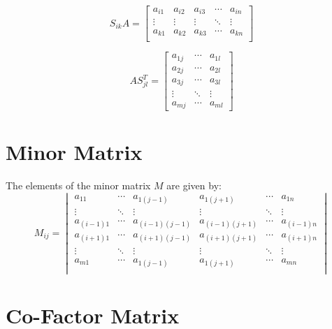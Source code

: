 \documentclass{article}
\begin{document}
    \begin{equation}
        S_{ik} A = \begin{bmatrix}
            a_{i1} & a_{i2} & a_{i3} & \cdots & a_{in} \\
            \vdots & \vdots & \vdots & \ddots & \vdots \\
            a_{k1} & a_{k2} & a_{k3} & \cdots & a_{kn} \\
        \end{bmatrix}
    \end{equation}

    \begin{equation}
        A S_{jl}^T = \begin{bmatrix}
            a_{1j} & \cdots & a_{1l} \\
            a_{2j} & \cdots & a_{2l} \\
            a_{3j} & \cdots & a_{3l} \\
            \vdots & \ddots & \vdots \\
            a_{mj} & \cdots & a_{ml}
        \end{bmatrix}
    \end{equation}

    \section{Minor Matrix}

    The elements of the minor matrix $M$ are given by: \begin{equation}
        M_{ij} = \begin{vmatrix}
            a_{11} & \cdots & a_{1(j - 1)} & a_{1(j + 1)} & \cdots & a_{1n} \\
            \vdots & \ddots & \vdots & \vdots & \ddots & \vdots \\
            a_{(i - 1)1} & \cdots & a_{(i - 1)(j - 1)} & a_{(i - 1)(j + 1)} & \cdots & a_{(i - 1)n} \\
            a_{(i + 1)1} & \cdots & a_{(i + 1)(j - 1)} & a_{(i + 1)(j + 1)} & \cdots & a_{(i + 1)n} \\
            \vdots & \ddots & \vdots & \vdots & \ddots & \vdots \\
            a_{m1} & \cdots & a_{1(j - 1)} & a_{1(j + 1)} & \cdots & a_{mn} \\
        \end{vmatrix}
    \end{equation}

    \section{Co-Factor Matrix}
\end{document}
